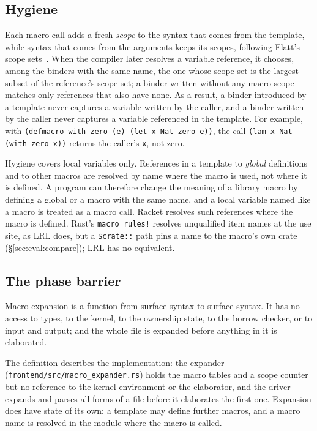 \subsection{Hygiene}\label{sec:macros:hygiene}

Each macro call adds a fresh \emph{scope} to the syntax that comes from the template, while syntax that comes from the arguments keeps its scopes, following Flatt's scope sets~\cite{flatt2016scopes}.
When the compiler later resolves a variable reference, it chooses, among the binders with the same name, the one whose scope set is the largest subset of the reference's scope set; a binder written without any macro scope matches only references that also have none.
As a result, a binder introduced by a template never captures a variable written by the caller, and a binder written by the caller never captures a variable referenced in the template.
For example, with \lstinline|(defmacro with-zero (e) (let x Nat zero e))|, the call \lstinline|(lam x Nat (with-zero x))| returns the caller's \lstinline|x|, not zero.

Hygiene covers local variables only.
References in a template to \emph{global} definitions and to other macros are resolved by name where the macro is used, not where it is defined.
A program can therefore change the meaning of a library macro by defining a global or a macro with the same name, and a local variable named like a macro is treated as a macro call.
Racket resolves such references where the macro is defined.
Rust's \lstinline|macro_rules!| resolves unqualified item names at the use site, as LRL does, but a \lstinline|$crate::| path pins a name to the macro's own crate (\S\ref{sec:eval:compare}); LRL has no equivalent.

\subsection{The phase barrier}\label{sec:macros:barrier}

\begin{definition}\label{def:phase-barrier}
Macro expansion is a function from surface syntax to surface syntax.
It has no access to types, to the kernel, to the ownership state, to the borrow checker, or to input and output; and the whole file is expanded before anything in it is elaborated.
\end{definition}

The definition describes the implementation: the expander (\texttt{frontend/src/macro\_expander.rs}) holds the macro tables and a scope counter but no reference to the kernel environment or the elaborator, and the driver expands and parses all forms of a file before it elaborates the first one.
Expansion does have state of its own: a template may define further macros, and a macro name is resolved in the module where the macro is called.


